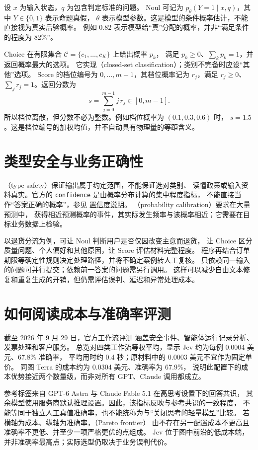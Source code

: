 \documentclass[UTF8,12pt,a4paper,fontset=fandol]{ctexart}
\begin{document}
设 $x$ 为输入状态，$q$ 为包含判定标准的问题。
Noul 可记为 $p_\theta(Y=1\mid x,q)$，其中 $Y\in\{0,1\}$ 表示命题真假，
$\theta$ 表示模型参数。这是模型的条件概率估计，不能直接视为真实后验概率。
例如 $0.82$ 表示模型给“真”分配的概率，并非“满足条件的程度为 82\%”。

Choice 在有限集合 $\mathcal C=\{c_1,\ldots,c_K\}$ 上给出概率 $p_k$，
满足 $p_k\geq0$、$\sum_k p_k=1$，并返回概率最大的选项。
它实现（closed-set classification）；类别不完备时应设“其他”选项。
Score 的档位编号为 $0,\ldots,m-1$，其档位概率记为 $r_j$，满足
$r_j\geq0$、$\sum_j r_j=1$。返回分数为
\begin{equation}
  s=\sum_{j=0}^{m-1}j\,r_j\in[0,m-1].
  \label{eq:jev-score}
\end{equation}
所以档位离散，但分数不必为整数。例如档位概率为 $(0.1,0.3,0.6)$ 时，
$s=1.5$。这是档位编号的加权均值，并不自动具有物理量的等距含义。

\section{类型安全与业务正确性}
\label{sec:jev-reliability}

（type safety）保证输出属于约定范围，不能保证选对类别、
读懂政策或输入资料真实。官方的 \texttt{confidence} 是由概率分布计算的集中程度指标，
不能直接当作“答案正确的概率”，参见
\href{https://docs.typesafe.ai/confidence}{置信度说明}。
（probability calibration）要求在大量预测中，
获得相近预测概率的事件，其实际发生频率与该概率相近；它需要在目标业务数据上检验。

以退货分流为例，可让 Noul 判断用户是否仅因改变主意而退货，
让 Choice 区分质量问题、个人偏好和其他原因，让 Score 评估材料完整程度。
程序再结合订单期限等确定性规则决定处理路径，并将不确定案例转人工复核。
只依赖同一输入的问题可并行提交；依赖前一答案的问题需另行调用。
这样可以减少自由文本修复和重复生成的开销，但仍需评估误判、延迟和异常处理成本。

\section{如何阅读成本与准确率评测}
\label{sec:jev-evaluation}

截至 2026 年 9 月 29 日，\href{https://evals.typesafe.ai/}{官方工作流评测}
涵盖安全事件、智能体运行记录分析、发票处理和客户服务。
总览对四类工作流等权平均，显示 Jev 约为每例 0.0004 美元、67.8\% 准确率，
平均用时约 0.4 秒；原材料中的 0.0003 美元不宜作为固定单价。
同图 Terra 的成本约为 0.0304 美元、准确率为 67.9\%，
说明此配置下的成本优势接近两个数量级，而非对所有 GPT、Claude 调用都成立。

参考标签来自 GPT-6 Astra 与 Claude Fable 5.1 在高思考设置下的回答共识，
其余模型使用服务商默认推理设置。因此，该指标反映与参考共识的一致程度，
不能等同于独立人工真值准确率，也不能统称为与“关闭思考的轻量模型”比较。
若横轴为成本、纵轴为准确率，（Pareto frontier）
由不存在另一配置成本不更高且准确率不更低、并至少一项严格更优的点组成。
Jev 位于图中前沿的低成本端，并非准确率最高点；实际选型仍取决于业务误判代价。
\end{document}
